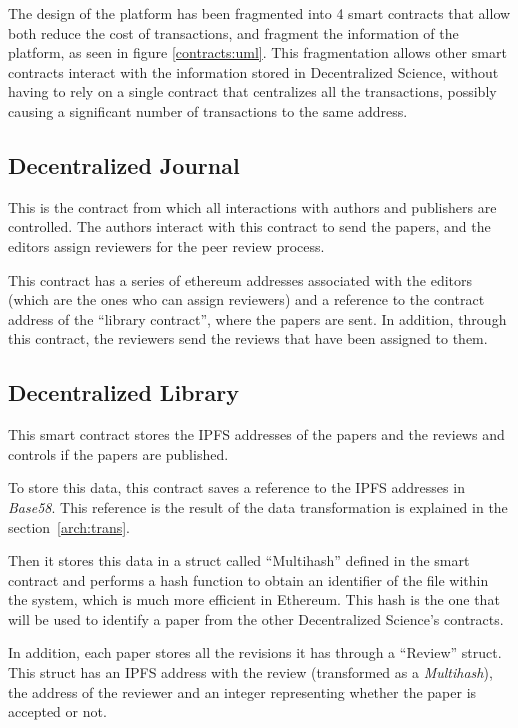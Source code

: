 
The design of the platform has been fragmented into 4 smart contracts that allow
both reduce the cost of transactions, and fragment the information of the
platform, as seen in figure \ref{contracts:uml}. This fragmentation allows other
smart contracts interact with the information stored in Decentralized Science,
without having to rely on a single contract that centralizes all the
transactions, possibly causing a significant number of transactions to the same
address.

\subsection*{Decentralized Journal}%

This is the contract from which all interactions with authors and publishers are
controlled. The authors interact with this contract to send the papers, and the
editors assign reviewers for the peer review process.

This contract has a series of ethereum addresses associated with the editors
(which are the ones who can assign reviewers) and a reference to the contract
address of the ``library contract'', where the papers are sent. In addition,
through this contract, the reviewers send the reviews that have been assigned to
them.

\subsection*{Decentralized Library}

This smart contract stores the IPFS addresses of the papers and the reviews and
controls if the papers are published.

To store this data, this contract saves a reference to the IPFS addresses in
\emph{Base58}. This reference is the result of the data transformation is
explained in the section~\ref{arch:trans}.

Then it stores this data in a struct called ``Multihash'' defined in the smart
contract and performs a hash function to obtain an identifier of the file within
the system, which is much more efficient in Ethereum. This hash is the one that
will be used to identify a paper from the other Decentralized Science's
contracts.

In addition, each paper stores all the revisions it has through a ``Review''
struct. This struct has an IPFS address with the review (transformed as a
\emph{Multihash}), the address of the reviewer and an integer representing
whether the paper is accepted or not.

